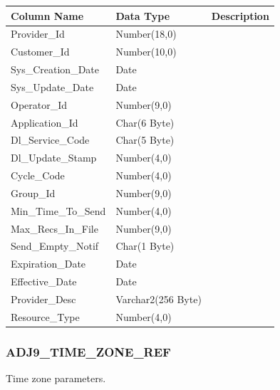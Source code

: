 \documentclass[12pt,twoside]{article}
\begin{document}
\begin{center}
\begin{tabular}{lll}
\hline
\textbf{Column Name} & \textbf{Data Type} & \textbf{Description}\\
\hline
Provider\_Id & Number(18,0) & \\
Customer\_Id & Number(10,0) & \\
Sys\_Creation\_Date & Date & \\
Sys\_Update\_Date & Date & \\
Operator\_Id & Number(9,0) & \\
Application\_Id & Char(6 Byte) & \\
Dl\_Service\_Code & Char(5 Byte) & \\
Dl\_Update\_Stamp & Number(4,0) & \\
Cycle\_Code & Number(4,0) & \\
Group\_Id & Number(9,0) & \\
Min\_Time\_To\_Send & Number(4,0) & \\
Max\_Recs\_In\_File & Number(9,0) & \\
Send\_Empty\_Notif & Char(1 Byte) & \\
Expiration\_Date & Date & \\
Effective\_Date & Date & \\
Provider\_Desc & Varchar2(256 Byte) & \\
Resource\_Type & Number(4,0) & \\
\hline
\end{tabular}
\end{center}

\normalsize

\subsubsection{ADJ9\_TIME\_ZONE\_REF}
\label{sec:orgheadline101}
Time zone parameters.
\end{document}

